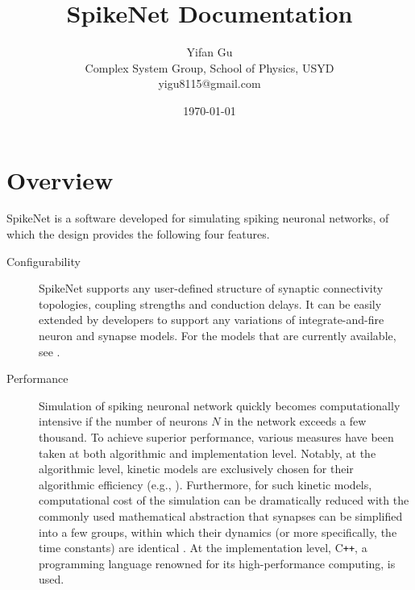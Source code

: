 \documentclass{article}
\title{SpikeNet Documentation}
\author{Yifan Gu  \\
	Complex System Group, School of Physics, USYD  \\
	yigu8115@gmail.com \\
	}
\date{\today}
\begin{document}
 \maketitle

\section{Overview}
SpikeNet is a software developed for simulating spiking neuronal networks, of which the design provides the following four features.

\begin{description}

\item [Configurability] SpikeNet supports any user-defined structure of synaptic connectivity topologies, coupling strengths and conduction delays. It can be easily extended by developers to support any variations of integrate-and-fire neuron and synapse models. For the models that are currently available, see .

\item [Performance]  Simulation of spiking neuronal network quickly becomes computationally intensive if the number of neurons $N$ in the network exceeds a few thousand. To achieve superior performance, various measures have been taken at both algorithmic and implementation level. Notably, at the algorithmic level, kinetic models are exclusively chosen for their algorithmic efficiency (e.g., \cite{destexhe1998kinetic, vogels2011inhibitory, hennig2015theoretical, treves1993mean}). Furthermore, for such kinetic models, computational cost of the simulation can be dramatically reduced  with the commonly used mathematical abstraction that synapses can be simplified into a few groups, within which their dynamics (or more specifically, the time constants) are identical \cite{destexhe1994efficient}. At the implementation level, C\texttt{++}, a programming language renowned for its high-performance computing, is used.


\end{description}
\end{document}
